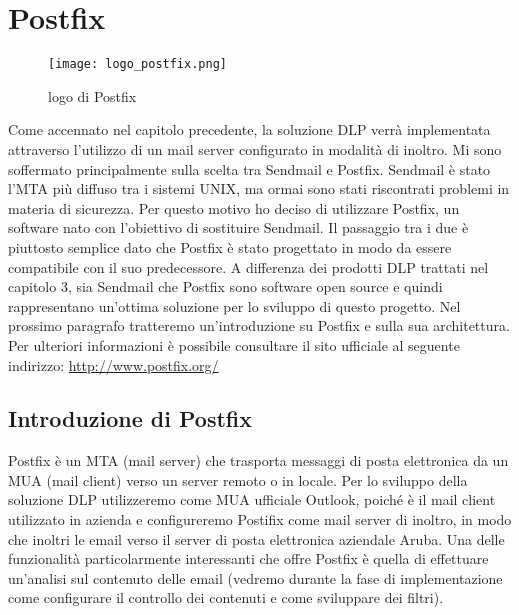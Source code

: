 \chapter{Postfix}

\begin{figure}[htp]
    \centering
    \texttt{[image: logo\_postfix.png]}
        \caption{logo di Postfix}\label{logoPostfix}
  \end{figure}
  
  Come accennato nel capitolo precedente, la soluzione DLP verrà implementata attraverso l'utilizzo di un 
  mail server configurato in modalità di inoltro.
  Mi sono soffermato principalmente sulla scelta tra Sendmail e Postfix. 
  Sendmail è stato l'MTA più diffuso tra i sistemi UNIX, ma ormai sono stati riscontrati problemi in materia
  di sicurezza. 
  Per questo motivo ho deciso di utilizzare Postfix, un software nato con l'obiettivo di sostituire Sendmail. Il passaggio
  tra i due è piuttosto semplice dato che Postfix è stato progettato in modo da essere compatibile con il 
  suo predecessore.
  A differenza dei prodotti DLP trattati nel capitolo 3, sia Sendmail che Postfix sono software open source e
  quindi rappresentano un'ottima soluzione per lo sviluppo di questo progetto.
  Nel prossimo paragrafo tratteremo un'introduzione su Postfix e sulla sua architettura. Per ulteriori
  informazioni è possibile consultare il sito ufficiale al seguente indirizzo: \url{http://www.postfix.org/}
   
  \pagebreak
  \section{Introduzione di Postfix}
  Postfix è un MTA (mail server) che trasporta messaggi di posta elettronica da un MUA (mail client) verso un server remoto o in locale. Per lo sviluppo della soluzione DLP utilizzeremo come MUA ufficiale Outlook, poiché è il mail client utilizzato in azienda e configureremo Postifix come mail server di inoltro, in modo che inoltri le email verso il server di posta elettronica aziendale Aruba. Una delle funzionalità particolarmente interessanti che offre Postfix è quella di effettuare un’analisi sul contenuto delle email (vedremo durante la fase di implementazione come configurare il controllo dei contenuti e come sviluppare dei filtri).
  
